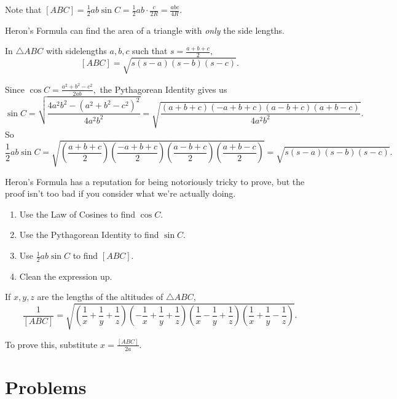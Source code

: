 \documentclass{article}
\begin{document}
\begin{pro}
Note that $[ABC]=\frac{1}{2}ab\sin C=\frac{1}{2}ab\cdot\frac{c}{2R}=\frac{abc}{4R}.$
\end{pro}

Heron's Formula can find the area of a triangle with \textit{only} the side lengths.

\begin{theo}
In $\triangle ABC$ with sidelengths $a,b,c$ such that $s=\frac{a+b+c}{2},$
\[[ABC]=\sqrt{s(s-a)(s-b)(s-c)}.\]
\end{theo}

\begin{pro}
Since $\cos C=\frac{a^2+b^2-c^2}{2ab},$ the Pythagorean Identity gives us \[\sin C=\sqrt{\frac{4a^2b^2-(a^2+b^2-c^2)^2}{4a^2b^2}}=\sqrt{\frac{(a+b+c)(-a+b+c)(a-b+c)(a+b-c)}{4a^2b^2}}.\] So \[\frac{1}{2}ab\sin C=\sqrt{\left(\frac{a+b+c}{2}\right)\left(\frac{-a+b+c}{2}\right)\left(\frac{a-b+c}{2}\right)\left(\frac{a+b-c}{2}\right)}=\sqrt{s(s-a)(s-b)(s-c)}.\]
\end{pro}

Heron's Formula has a reputation for being notoriously tricky to prove, but the proof isn't too bad if you consider what we're actually doing.
\begin{enumerate}
	\item Use the Law of Cosines to find $\cos C.$
	
	\item Use the Pythagorean Identity to find $\sin C.$
	
	\item Use $\frac{1}{2}ab\sin C$ to find $[ABC].$
	
	\item Clean the expression up.
\end{enumerate}

\begin{fact}
If $x,y,z$ are the lengths of the altitudes of $\triangle ABC,$
\[\frac{1}{[ABC]}=\sqrt{\left(\frac{1}{x}+\frac{1}{y}+\frac{1}{z}\right)\left(-\frac{1}{x}+\frac{1}{y}+\frac{1}{z}\right)\left(\frac{1}{x}-\frac{1}{y}+\frac{1}{z}\right)\left(\frac{1}{x}+\frac{1}{y}-\frac{1}{z}\right)}.\]
\end{fact}

To prove this, substitute $x=\frac{[ABC]}{2a}.$

\pagebreak

\section{Problems}
\end{document}
